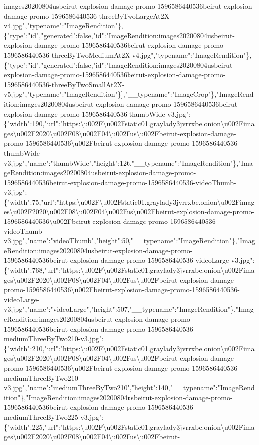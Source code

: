 images20200804usbeirut-explosion-damage-promo-1596586440536beirut-explosion-damage-promo-1596586440536-threeByTwoLargeAt2X-v4.jpg","typename":"ImageRendition"\},\{"type":"id","generated":false,"id":"ImageRendition:images20200804usbeirut-explosion-damage-promo-1596586440536beirut-explosion-damage-promo-1596586440536-threeByTwoMediumAt2X-v4.jpg","typename":"ImageRendition"\},\{"type":"id","generated":false,"id":"ImageRendition:images20200804usbeirut-explosion-damage-promo-1596586440536beirut-explosion-damage-promo-1596586440536-threeByTwoSmallAt2X-v5.jpg","typename":"ImageRendition"\}{]},"\_\_typename":"ImageCrop"\},"ImageRendition:images20200804usbeirut-explosion-damage-promo-1596586440536beirut-explosion-damage-promo-1596586440536-thumbWide-v3.jpg":\{"width":190,"url":"https:\textbackslash{}u002F\textbackslash{}u002Fstatic01.graylady3jvrrxbe.onion\textbackslash{}u002Fimages\textbackslash{}u002F2020\textbackslash{}u002F08\textbackslash{}u002F04\textbackslash{}u002Fus\textbackslash{}u002Fbeirut-explosion-damage-promo-1596586440536\textbackslash{}u002Fbeirut-explosion-damage-promo-1596586440536-thumbWide-v3.jpg","name":"thumbWide","height":126,"\_\_typename":"ImageRendition"\},"ImageRendition:images20200804usbeirut-explosion-damage-promo-1596586440536beirut-explosion-damage-promo-1596586440536-videoThumb-v3.jpg":\{"width":75,"url":"https:\textbackslash{}u002F\textbackslash{}u002Fstatic01.graylady3jvrrxbe.onion\textbackslash{}u002Fimages\textbackslash{}u002F2020\textbackslash{}u002F08\textbackslash{}u002F04\textbackslash{}u002Fus\textbackslash{}u002Fbeirut-explosion-damage-promo-1596586440536\textbackslash{}u002Fbeirut-explosion-damage-promo-1596586440536-videoThumb-v3.jpg","name":"videoThumb","height":50,"\_\_typename":"ImageRendition"\},"ImageRendition:images20200804usbeirut-explosion-damage-promo-1596586440536beirut-explosion-damage-promo-1596586440536-videoLarge-v3.jpg":\{"width":768,"url":"https:\textbackslash{}u002F\textbackslash{}u002Fstatic01.graylady3jvrrxbe.onion\textbackslash{}u002Fimages\textbackslash{}u002F2020\textbackslash{}u002F08\textbackslash{}u002F04\textbackslash{}u002Fus\textbackslash{}u002Fbeirut-explosion-damage-promo-1596586440536\textbackslash{}u002Fbeirut-explosion-damage-promo-1596586440536-videoLarge-v3.jpg","name":"videoLarge","height":507,"\_\_typename":"ImageRendition"\},"ImageRendition:images20200804usbeirut-explosion-damage-promo-1596586440536beirut-explosion-damage-promo-1596586440536-mediumThreeByTwo210-v3.jpg":\{"width":210,"url":"https:\textbackslash{}u002F\textbackslash{}u002Fstatic01.graylady3jvrrxbe.onion\textbackslash{}u002Fimages\textbackslash{}u002F2020\textbackslash{}u002F08\textbackslash{}u002F04\textbackslash{}u002Fus\textbackslash{}u002Fbeirut-explosion-damage-promo-1596586440536\textbackslash{}u002Fbeirut-explosion-damage-promo-1596586440536-mediumThreeByTwo210-v3.jpg","name":"mediumThreeByTwo210","height":140,"\_\_typename":"ImageRendition"\},"ImageRendition:images20200804usbeirut-explosion-damage-promo-1596586440536beirut-explosion-damage-promo-1596586440536-mediumThreeByTwo225-v3.jpg":\{"width":225,"url":"https:\textbackslash{}u002F\textbackslash{}u002Fstatic01.graylady3jvrrxbe.onion\textbackslash{}u002Fimages\textbackslash{}u002F2020\textbackslash{}u002F08\textbackslash{}u002F04\textbackslash{}u002Fus\textbackslash{}u002Fbeirut-